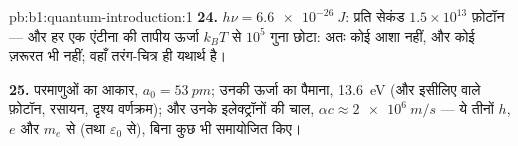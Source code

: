 \begin{solution}{pb:b1:quantum-introduction:1}
\textbf{24.} $h\nu = \qty{6.6e-26}{J}$: प्रति सेकंड $1.5 \times 10^{13}$ फ़ोटॉन ---
और हर एक एंटीना की तापीय ऊर्जा $k_BT$ से $10^5$ गुना छोटा: अतः कोई आशा
नहीं, और कोई ज़रूरत भी नहीं; वहाँ तरंग-चित्र ही यथार्थ है।

\textbf{25.} परमाणुओं का आकार, $a_0 = \qty{53}{pm}$; उनकी ऊर्जा का पैमाना,
\qty{13.6}{eV} (और इसीलिए  वाले फ़ोटॉन, रसायन, दृश्य
वर्णक्रम); और उनके इलेक्ट्रॉनों की चाल, $\alpha c \approx \qty{2e6}{m/s}$ ---
ये तीनों $h$, $e$ और $m_e$ से (तथा $\varepsilon_0$ से), बिना कुछ भी समायोजित किए।
\end{solution}
